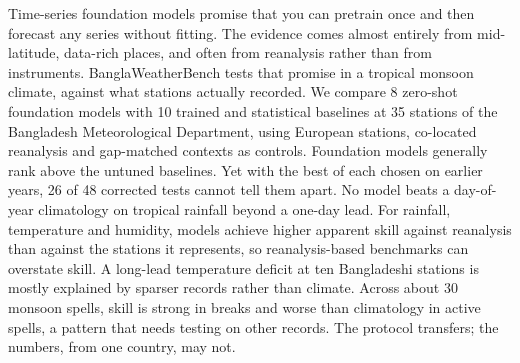 Time-series foundation models promise that you can pretrain once and then forecast any series without fitting.
The evidence comes almost entirely from mid-latitude, data-rich places, and often from reanalysis rather than
from instruments. BanglaWeatherBench tests that promise in a tropical monsoon climate, against what stations
actually recorded. We compare 8 zero-shot foundation models with 10 trained and statistical baselines at 35
stations of the Bangladesh Meteorological Department, using European stations, co-located reanalysis and
gap-matched contexts as controls. Foundation models generally rank above the untuned baselines. Yet with the best
of each chosen on earlier years, 26 of 48 corrected tests cannot tell them apart. No model beats a day-of-year
climatology on tropical rainfall beyond a one-day lead. For rainfall, temperature and humidity, models achieve higher
apparent skill against reanalysis than against the stations it represents, so reanalysis-based benchmarks can
overstate skill. A long-lead
temperature deficit at ten Bangladeshi stations is mostly explained by sparser records rather than climate.
Across about 30 monsoon spells, skill is strong in breaks and worse than climatology in active spells, a
pattern that needs testing on other records. The protocol transfers; the numbers, from one country, may not.
